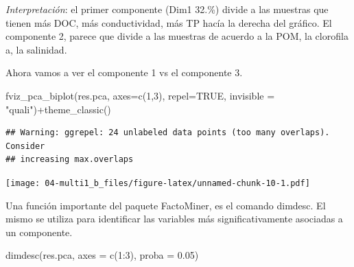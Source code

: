 \documentclass[
]{book}
\newenvironment{Shaded}{\begin{snugshade}}{\end{snugshade}}
\newcommand{\AttributeTok}[1]{\textcolor[rgb]{0.77,0.63,0.00}{#1}}
\newcommand{\ConstantTok}[1]{\textcolor[rgb]{0.00,0.00,0.00}{#1}}
\newcommand{\DecValTok}[1]{\textcolor[rgb]{0.00,0.00,0.81}{#1}}
\newcommand{\FloatTok}[1]{\textcolor[rgb]{0.00,0.00,0.81}{#1}}
\newcommand{\FunctionTok}[1]{\textcolor[rgb]{0.00,0.00,0.00}{#1}}
\newcommand{\NormalTok}[1]{#1}
\newcommand{\SpecialCharTok}[1]{\textcolor[rgb]{0.00,0.00,0.00}{#1}}
\newcommand{\StringTok}[1]{\textcolor[rgb]{0.31,0.60,0.02}{#1}}
\begin{document}
\emph{Interpretación}: el primer componente (Dim1 32.\%) divide a las muestras que tienen más DOC, más conductividad, más TP hacía la derecha del gráfico. El componente 2, parece que divide a las muestras de acuerdo a la POM, la clorofila a, la salinidad.

Ahora vamos a ver el componente 1 vs el componente 3.

\begin{Shaded}
\begin{Highlighting}[]
\FunctionTok{fviz\_pca\_biplot}\NormalTok{(res.pca, }\AttributeTok{axes=}\FunctionTok{c}\NormalTok{(}\DecValTok{1}\NormalTok{,}\DecValTok{3}\NormalTok{),  }\AttributeTok{repel=}\ConstantTok{TRUE}\NormalTok{, }\AttributeTok{invisible =} \StringTok{"quali"}\NormalTok{)}\SpecialCharTok{+}\FunctionTok{theme\_classic}\NormalTok{()}
\end{Highlighting}
\end{Shaded}

\begin{verbatim}
## Warning: ggrepel: 24 unlabeled data points (too many overlaps). Consider
## increasing max.overlaps
\end{verbatim}

\texttt{[image: 04-multi1\_b\_files/figure-latex/unnamed-chunk-10-1.pdf]}

Una función importante del paquete FactoMiner, es el comando dimdesc. El mismo se utiliza para identificar las variables más significativamente asociadas a un componente.

\begin{Shaded}
\begin{Highlighting}[]
\FunctionTok{dimdesc}\NormalTok{(res.pca, }\AttributeTok{axes =} \FunctionTok{c}\NormalTok{(}\DecValTok{1}\SpecialCharTok{:}\DecValTok{3}\NormalTok{), }\AttributeTok{proba =} \FloatTok{0.05}\NormalTok{)}
\end{Highlighting}
\end{Shaded}
\end{document}
